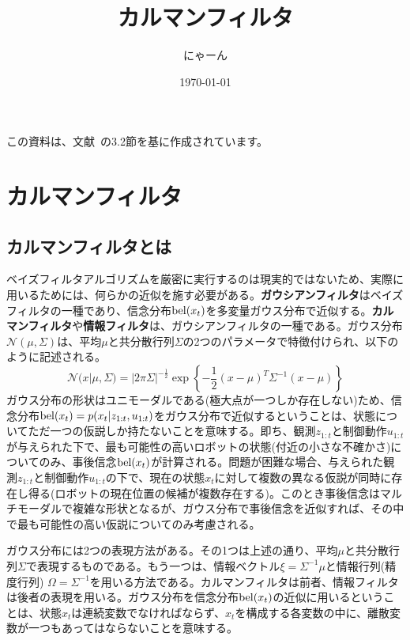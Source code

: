 \documentclass[dvipdfmx,a4paper]{jsarticle}
\title{カルマンフィルタ}
\author{にゃーん}
\date{\today}
\begin{document}
\maketitle

この資料は、文献~\cite{Thrun07}の3.2節を基に作成されています。

\section{カルマンフィルタ}
\subsection{カルマンフィルタとは}
ベイズフィルタアルゴリズムを厳密に実行するのは現実的ではないため、実際に用いるためには、何らかの近似を施す必要がある。\textbf{ガウシアンフィルタ}はベイズフィルタの一種であり、信念分布$\operatorname{bel}(x_t)$を多変量ガウス分布で近似する。\textbf{カルマンフィルタ}や\textbf{情報フィルタ}は、ガウシアンフィルタの一種である。ガウス分布$\mathcal{N}(\mu, \Sigma)$は、平均$\mu$と共分散行列$\Sigma$の2つのパラメータで特徴付けられ、以下のように記述される。
\begin{equation}
	\mathcal{N}(x | \mu, \Sigma) = |2 \pi \Sigma|^{-\frac{1}{2}} \exp \left\{ -\frac{1}{2} \left( x - \mu \right)^T \Sigma^{-1} \left( x - \mu \right) \right\}
\end{equation}
ガウス分布の形状はユニモーダルである(極大点が一つしか存在しない)ため、信念分布$\operatorname{bel}(x_t) = p(x_t | z_{1 : t}, u_{1 : t})$をガウス分布で近似するということは、状態についてただ一つの仮説しか持たないことを意味する。即ち、観測$z_{1 : t}$と制御動作$u_{1 : t}$が与えられた下で、最も可能性の高いロボットの状態(付近の小さな不確かさ)についてのみ、事後信念$\operatorname{bel}(x_t)$が計算される。問題が困難な場合、与えられた観測$z_{1 : t}$と制御動作$u_{1 : t}$の下で、現在の状態$x_t$に対して複数の異なる仮説が同時に存在し得る(ロボットの現在位置の候補が複数存在する)。このとき事後信念はマルチモーダルで複雑な形状となるが、ガウス分布で事後信念を近似すれば、その中で最も可能性の高い仮説についてのみ考慮される。\newline

ガウス分布には2つの表現方法がある。その1つは上述の通り、平均$\mu$と共分散行列$\Sigma$で表現するものである。もう一つは、情報ベクトル$\xi = \Sigma^{-1} \mu$と情報行列(精度行列) $\Omega = \Sigma^{-1}$を用いる方法である。カルマンフィルタは前者、情報フィルタは後者の表現を用いる。ガウス分布を信念分布$\operatorname{bel}(x_t)$の近似に用いるということは、状態$x_t$は連続変数でなければならず、$x_t$を構成する各変数の中に、離散変数が一つもあってはならないことを意味する。\newline
\end{document}
